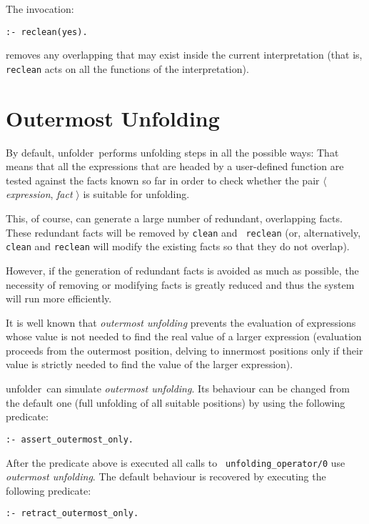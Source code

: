 \documentclass[11pt,a4paper,twoside,openright]{book}
\newcommand{\unfolder}{{\textsf{unfolder~}}}
\begin{document}
The invocation:

\begin{verbatim}
:- reclean(yes).
\end{verbatim}

\noindent
removes any overlapping that may exist inside the current
interpretation (that is, {\tt reclean} acts on all the functions of the
interpretation). 



\chapter{Outermost Unfolding}
\label{chap_outermost}

By default, \unfolder performs unfolding steps in all the possible
ways: That means that all the expressions that are headed by a
user-defined function are tested against the facts known so far in order
to check whether the pair $\langle$ {\em expression}, {\em fact}
$\rangle$ is suitable for unfolding.

This, of course, can generate a large number of redundant, overlapping
facts. These redundant facts will be removed by {\tt clean} and {\tt
 reclean} (or, alternatively, {\tt clean} and {\tt reclean} will
modify the existing facts so that they do not overlap).

However, if the generation of redundant facts is avoided as much as
possible, the necessity of removing or modifying facts is greatly
reduced and thus the system will run more efficiently.

It is well known that {\em outermost unfolding} prevents the evaluation of
expressions whose value is not needed to find the real value of a
larger expression (evaluation proceeds from the outermost position,
delving to innermost positions only if their value is strictly needed
to find the value of the larger expression).

\unfolder can simulate {\em outermost unfolding}. Its behaviour can be
changed from the default one (full unfolding of all suitable
positions) by using the following predicate:

\begin{verbatim}
:- assert_outermost_only.
\end{verbatim} 

\noindent
After the predicate above is executed all calls to {\tt
  unfolding\_operator/0} use {\em outermost unfolding}. The default
behaviour is recovered by executing the following predicate:

\begin{verbatim}
:- retract_outermost_only.
\end{verbatim} 
\end{document}
